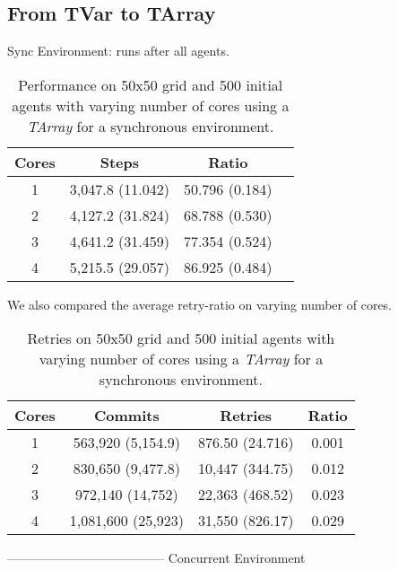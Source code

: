 \subsection{From TVar to TArray}
Sync Environment: runs after all agents.

\begin{table}
	\centering
  	\begin{tabular}{ c || c | c | c }
        Cores & Steps            & Ratio          \\ \hline \hline 
    	1     & 3,047.8 (11.042) & 50.796 (0.184) \\ \hline
   		2     & 4,127.2 (31.824) & 68.788 (0.530) \\ \hline
   		3     & 4,641.2 (31.459) & 77.354 (0.524) \\ \hline
   		4     & 5,215.5 (29.057) & 86.925 (0.484) \\ \hline \hline
   	\end{tabular}
  	
  	\caption{Performance on 50x50 grid and 500 initial agents with varying number of cores using a \textit{TArray} for a synchronous environment.}
	\label{tab:tarray_results_syncenv_time}
\end{table}

We also compared the average retry-ratio on varying number of cores.


\begin{table}
	\centering
  	\begin{tabular}{ c || c | c | c }
        Cores & Commits            & Retries         & Ratio \\ \hline \hline 
    	1     & 563,920 (5,154.9)  & 876.50 (24.716) & 0.001 \\ \hline
   		2     & 830,650 (9,477.8)  & 10,447 (344.75) & 0.012 \\ \hline
   		3     & 972,140 (14,752)   & 22,363 (468.52) & 0.023 \\ \hline
   		4     & 1,081,600 (25,923) & 31,550 (826.17) & 0.029 \\ \hline
   	\end{tabular}
  	
  	\caption{Retries on 50x50 grid and 500 initial agents with varying number of cores using a \textit{TArray} for a synchronous environment.}
	\label{tab:tarray_results_syncenv_retries}
\end{table}

--------------------------------------
Concurrent Environment


